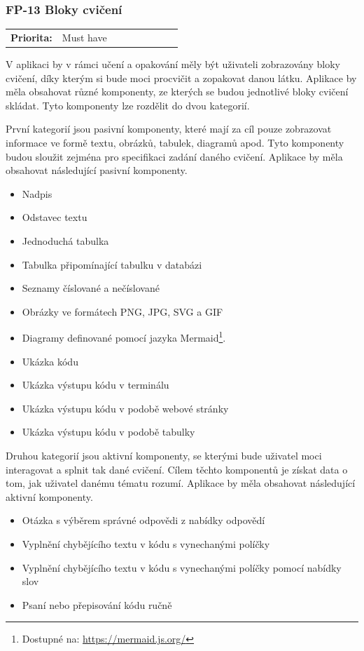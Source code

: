 \subsubsection{FP-13 Bloky cvičení}\label{sec:fp-exercise-blocks}

\begin{tabular}{lp{0.7\linewidth}}
    \textbf{Priorita:} & Must have \\
\end{tabular}

V aplikaci by v rámci učení a opakování měly být uživateli zobrazovány bloky cvičení, díky kterým si bude moci procvičit a zopakovat danou látku. Aplikace by měla obsahovat různé komponenty, ze kterých se budou jednotlivé bloky cvičení skládat. Tyto komponenty lze rozdělit do dvou kategorií.

První kategorií jsou pasivní komponenty, které mají za cíl pouze zobrazovat informace ve formě textu, obrázků, tabulek, diagramů apod. Tyto komponenty budou sloužit zejména pro specifikaci zadání daného cvičení. Aplikace by měla obsahovat následující pasivní komponenty.

\begin{itemize}
    \item Nadpis
    \item Odstavec textu
    \item Jednoduchá tabulka
    \item Tabulka připomínající tabulku v databázi
    \item Seznamy číslované a nečíslované
    \item Obrázky ve formátech PNG, JPG, SVG a GIF
    \item Diagramy definované pomocí jazyka Mermaid\footnote{Dostupné na: \href{https://mermaid.js.org/}{https://mermaid.js.org/}}.
    \item Ukázka kódu
    \item Ukázka výstupu kódu v terminálu
    \item Ukázka výstupu kódu v podobě webové stránky
    \item Ukázka výstupu kódu v podobě tabulky
\end{itemize}

Druhou kategorií jsou aktivní komponenty, se kterými bude uživatel moci interagovat a splnit tak dané cvičení. Cílem těchto komponentů je získat data o tom, jak uživatel danému tématu rozumí. Aplikace by měla obsahovat následující aktivní komponenty.

\begin{itemize}
    \item Otázka s výběrem správné odpovědi z nabídky odpovědí
    \item Vyplnění chybějícího textu v kódu s vynechanými políčky
    \item Vyplnění chybějícího textu v kódu s vynechanými políčky pomocí nabídky slov
    \item Psaní nebo přepisování kódu ručně
\end{itemize}

